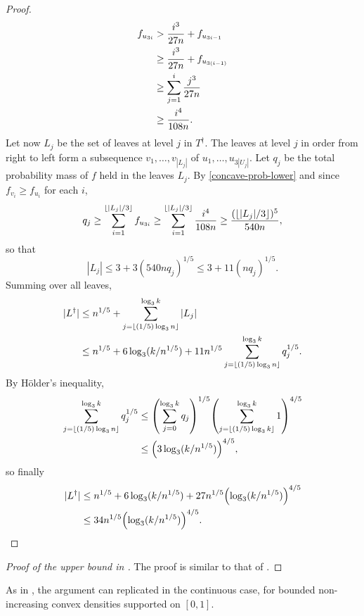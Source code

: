 \begin{proof}
\begin{align}
    f_{u_{3i}} &> \frac{i^3}{27n} + f_{u_{3i - 1}} \notag \\
               &\ge \frac{i^3}{27n} + f_{u_{3(i - 1)}} \notag \\
               &\ge \sum_{j = 1}^i \frac{j^3}{27n} \notag \\
               &\ge \frac{i^4}{108 n} . \eqlabel{concave-prob-lower}
  \end{align}
  Let now $L_j$ be the set of leaves at level $j$ in $T^\dagger$. The
  leaves at level $j$ in order from right to left form a subsequence
  $v_1, \dots, v_{|L_{j}|}$ of $u_1, \dots, u_{3|U_j|}$. Let $q_j$ be
  the total probability mass of $f$ held in the leaves $L_j$. By
  \eqref{concave-prob-lower} and since $f_{v_i} \ge f_{u_i}$ for each
  $i$,
  \begin{align*}
    q_j \ge \sum_{i = 1}^{\floor{|L_j|/3}} f_{u_{3i}} \ge \sum_{i = 1}^{\floor{|L_j|/3}} \frac{i^4}{108n} \ge \frac{(\floor{|L_j|/3})^5}{540 n} ,
  \end{align*}
  so that
  \[
    |L_j| \le 3 + 3 (540 n q_j)^{1/5} \le 3 + 11 (n q_j)^{1/5} .
  \]
  Summing over all leaves,
  \begin{align*}
    |L^\dagger|  &\le n^{1/5} + \sum_{j = \floor{(1/5) \log_3 n}}^{\log_3 k} |L_j| \\
                 &\le n^{1/5} + 6 \log_3 (k/n^{1/5}) + 11 n^{1/5} \sum_{j = \floor{(1/5) \log_3 n}}^{\log_3 k} q_j^{1/5} .
  \end{align*}
  By H\"{o}lder's inequality,
  \begin{align*}
    \sum_{j = \floor{(1/5) \log_3 n}}^{\log_3 k} q_j^{1/5} &\le {\left( \sum_{j = 0}^{\log_3 k} q_j \right)}^{1/5} {\left( \sum_{j = \floor{(1/5) \log_3 k}}^{\log_3 k} 1 \right)}^{4/5} \\
                                                               &\le {\left(3 \log_3 (k/n^{1/5}) \right)}^{4/5} ,
  \end{align*}
  so finally
  \begin{align*}
    |L^\dagger| &\le n^{1/5} + 6 \log_3 (k/n^{1/5}) + 27 n^{1/5} {\left(\log_3 (k/n^{1/5})\right)}^{4/5} \\
                &\le 34 n^{1/5} {\left(\log_3 (k/n^{1/5}) \right)}^{4/5} . \qedhere
  \end{align*}
\end{proof}

\begin{proof}[Proof of the upper bound in ]
  The proof is similar to that of .
\end{proof}

\begin{rem}
  As in , the argument can replicated in the
  continuous case, for bounded non-increasing convex densities
  supported on $[0, 1]$.
\end{rem}
